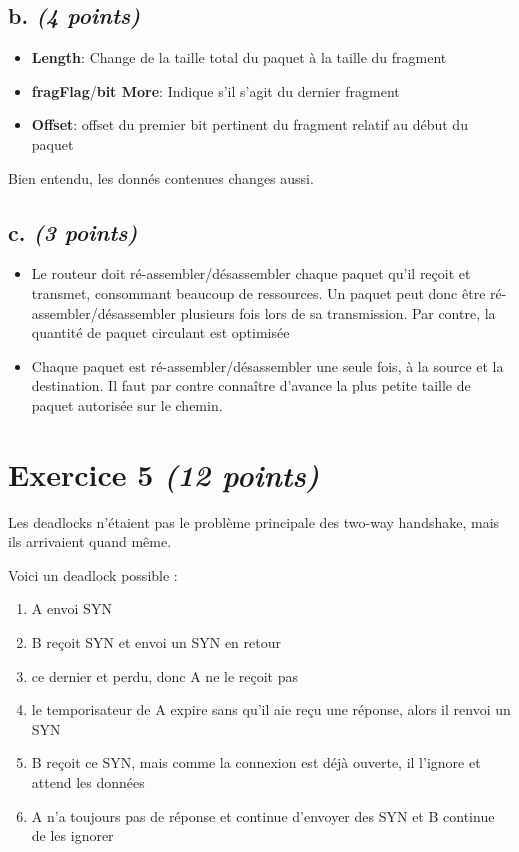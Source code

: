 \documentclass{article}
\begin{document}
\subsection{b. \emph{(4 points)}}
\begin{itemize}
    \item \textbf{Length}: Change de la taille total du paquet à la taille du fragment
    \item \textbf{fragFlag}/\textbf{bit More}: Indique s'il s'agit du dernier fragment
    \item \textbf{Offset}: offset du premier bit pertinent du fragment relatif au début du paquet
\end{itemize}
Bien entendu, les donnés contenues changes aussi.

\subsection{c. \emph{(3 points)}}
\begin{itemize}
    \item Le routeur doit ré-assembler/désassembler chaque paquet qu'il reçoit et transmet, consommant beaucoup de ressources. Un paquet peut donc être ré-assembler/désassembler plusieurs fois lors de sa transmission. Par contre, la quantité de paquet circulant est optimisée
    \item Chaque paquet est ré-assembler/désassembler une seule fois, à la source et la destination. Il faut par contre connaître d'avance la plus petite taille de paquet autorisée sur le chemin.
\end{itemize}

\clearpage

\section{Exercice 5 \emph{(12 points)}}

Les deadlocks n'étaient pas le problème principale des two-way handshake, mais ils arrivaient quand même.

Voici un deadlock possible :
\begin{enumerate}
    \item A envoi SYN
    \item B reçoit SYN et envoi un SYN en retour
    \item ce dernier et perdu, donc A ne le reçoit pas
    \item le temporisateur de A expire sans qu'il aie reçu une réponse, alors il renvoi un SYN
    \item B reçoit ce SYN, mais comme la connexion est déjà ouverte, il l'ignore et attend les données
    \item A n'a toujours pas de réponse et continue d'envoyer des SYN et B continue de les ignorer
\end{enumerate}
\end{document}
